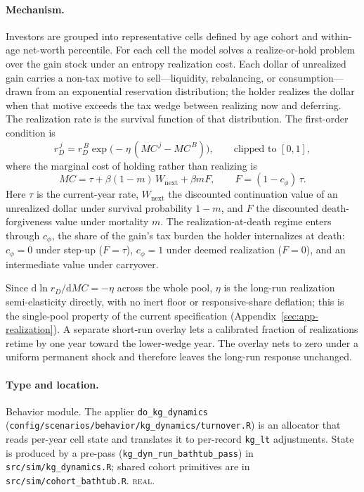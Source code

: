 \documentclass[11pt]{article}
\newcommand{\code}[1]{\texttt{\small #1}}
\newcommand{\field}[1]{\paragraph{#1.}}
\begin{document}
\field{Mechanism}
Investors are grouped into representative cells defined by age cohort and
within-age net-worth percentile. For each cell the model solves a
realize-or-hold problem over the gain stock under an entropy realization cost.
Each dollar of unrealized gain carries a non-tax motive to sell---liquidity,
rebalancing, or consumption---drawn from an exponential reservation
distribution; the holder realizes the dollar when that motive exceeds the tax
wedge between realizing now and deferring. The realization rate is the survival
function of that distribution. The first-order condition is
\begin{equation}
\label{eq:foc}
r_D^{\,j} = r_D^{\,B}\exp\!\big(-\eta\,(MC^{\,j}-MC^{\,B})\big),
\qquad \text{clipped to } [0,1],
\end{equation}
where the marginal cost of holding rather than realizing is
\begin{equation}
\label{eq:mc}
MC = \tau + \beta(1-m)\,W_{\text{next}} + \beta m F,
\qquad F = (1-c_\phi)\,\tau.
\end{equation}
Here $\tau$ is the current-year rate, $W_{\text{next}}$ the discounted
continuation value of an unrealized dollar under survival probability $1-m$, and
$F$ the discounted death-forgiveness value under mortality $m$. The
realization-at-death regime enters through $c_\phi$, the share of the gain's
tax burden the holder internalizes at death: $c_\phi=0$ under step-up ($F=\tau$),
$c_\phi=1$ under deemed realization ($F=0$), and an intermediate value under
carryover.

Since $\mathrm{d}\ln r_D/\mathrm{d}MC = -\eta$ across the whole pool, $\eta$ is
the long-run realization semi-elasticity directly, with no inert floor or
responsive-share deflation; this is the single-pool property of the current
specification (Appendix~\ref{sec:app-realization}). A separate short-run overlay
lets a calibrated fraction of realizations retime by one year toward the
lower-wedge year. The overlay nets to zero under a uniform permanent shock and
therefore leaves the long-run response unchanged.

\field{Type and location}
Behavior module. The applier \code{do_kg_dynamics}
(\code{config/scenarios/behavior/kg_dynamics/turnover.R}) is an allocator that
reads per-year cell state and translates it to per-record \code{kg_lt}
adjustments. State is produced by a pre-pass (\code{kg_dyn_run_bathtub_pass}) in
\code{src/sim/kg_dynamics.R}; shared cohort primitives are in
\code{src/sim/cohort_bathtub.R}. \textsc{real}.
\end{document}
